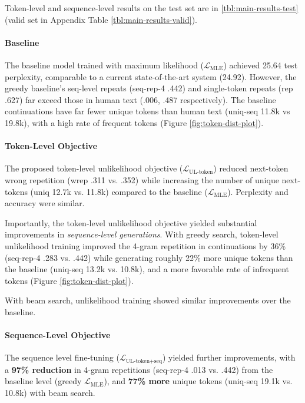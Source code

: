 Token-level and sequence-level results on the test set are  in \autoref{tbl:main-results-test} (valid set in Appendix Table \ref{tbl:main-results-valid}).

\paragraph{Baseline} The baseline model trained with maximum likelihood ($\mathcal{L}_{\text{MLE}}$) achieved 25.64 test perplexity, comparable to a current state-of-the-art system \citep{baevski2018adaptive} (24.92). However, the greedy baseline's seq-level repeats (seq-rep-4 .442) and single-token repeats (rep .627) far exceed those in human text (.006, .487 respectively). The baseline continuations have far fewer unique tokens than human text (uniq-seq 11.8k vs 19.8k), with a high rate of frequent tokens (Figure \ref{fig:token-dist-plot}). 

\paragraph{Token-Level Objective} 

The proposed token-level unlikelihood objective ($\mathcal{L}_{\text{UL-token}}$) reduced next-token wrong repetition  (wrep .311 vs. .352) while increasing the number of unique next-tokens (uniq 12.7k vs. 11.8k) compared to the baseline ($\mathcal{L}_{\text{MLE}}$).  Perplexity and accuracy were similar.

Importantly, the token-level unlikelihood objective yielded substantial improvements in \textit{sequence-level generations}. With greedy search, token-level unlikelihood training improved the 4-gram repetition in continuations by 36\% (seq-rep-4 .283 vs. .442) while generating roughly 22\% more unique tokens than the baseline (uniq-seq 13.2k vs. 10.8k), and a more favorable rate of infrequent tokens (Figure \ref{fig:token-dist-plot}).

With beam search, unlikelihood training showed similar improvements over the baseline.

\paragraph{Sequence-Level Objective} 

The sequence level fine-tuning ($\mathcal{L}_{\text{UL-token+seq}}$) yielded further improvements, with a {\bf 97\% reduction} in 4-gram repetitions (seq-rep-4 .013 vs. .442) from the baseline level (greedy $\mathcal{L}_{\text{MLE}}$), and {\bf 77\% more} unique tokens (uniq-seq 19.1k vs. 10.8k) with beam search.

